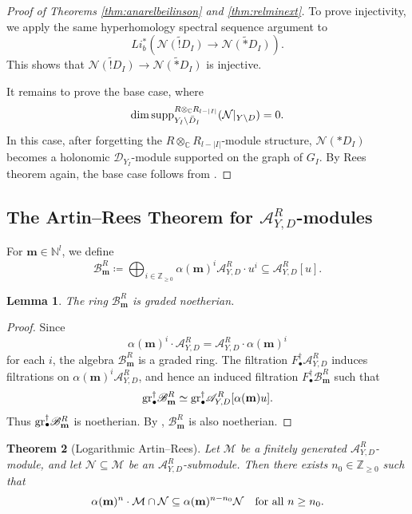 \documentclass{amsart}
\theoremstyle{plain}
\newtheorem{theorem}{Theorem}
\numberwithin{theorem}{section}
\newtheorem{lemma}[theorem]{Lemma}
\theoremstyle{definition}
\theoremstyle{remark}
\theoremstyle{definition}
\newcommand{\wt}{\widetilde}
\newcommand{\C}{\mathbb{C}} %
\newcommand{\N}{\mathbb{N}}
\newcommand{\Z}{\mathbb{Z}}
\newcommand{\cM}{\mathcal{M}}
\newcommand{\cN}{\mathcal{N}}
\newcommand{\bm}{\mathbf{m}}
\newcommand{\gr}{\textup{gr}}
\newcommand{\sB}{\mathscr{B}}
\newcommand{\sA}{\mathscr{A}}
\newcommand{\shD}{\mathscr{D}}
\newcommand{\supp}{\textup{supp}}
\begin{document}
\begin{proof}[Proof of Theorems \ref{thm:anarelbeilinson} and \ref{thm:relminext}]
To prove injectivity, we apply the same hyperhomology spectral sequence
argument to
\[
Li_b^*
\left(
\wt{\cN(!D_I)}
\longrightarrow
\wt{\cN(*D_I)}
\right).
\]
This shows that
$\wt{\cN(!D_I)}
\longrightarrow
\wt{\cN(*D_I)}$
is injective.

It remains to prove the base case, where
\[
\dim
\supp_{Y_I\setminus \bar D_I}^{R\otimes_\C R_{l-|I|}}
(\cN|_{Y\setminus D})
=
0.
\]
In this case, after forgetting the $R\otimes_\C R_{l-|I|}$-module structure,
$\cN(*D_I)$ becomes a holonomic $\shD_{Y_I}$-module supported on the graph of
$G_I$. By Rees theorem again, the base case follows from
\cite[Lem.3.7]{WuRHA}.
\end{proof}

\subsection{The Artin--Rees Theorem for $\sA^R_{Y,D}$-modules}
\label{subsect:logArtinRees}

For $\bm\in \N^l$, we define
\[
\sB^R_\bm
\coloneqq
\bigoplus_{i\in \Z_{\ge 0}}
\alpha(\bm)^i\sA^R_{Y,D}\cdot u^i
\subseteq
\sA^R_{Y,D}[u].
\]

\begin{lemma}
The ring $\sB^R_\bm$ is graded noetherian.
\end{lemma}

\begin{proof}
Since
\[
\alpha(\bm)^i\cdot\sA^R_{Y,D}
=
\sA^R_{Y,D}\cdot\alpha(\bm)^i
\]
for each $i$, the algebra $\sB^R_\bm$ is a graded ring.
The filtration $F^\dagger_\bullet\sA^R_{Y,D}$ induces filtrations on
$\alpha(\bm)^i\sA^R_{Y,D}$, and hence an induced filtration
$F^\dagger_\bullet\sB^R_\bm$ such that
\[
\gr^\dagger_\bullet\sB^R_\bm
\simeq
\gr^\dagger_\bullet\sA^R_{Y,D}[\alpha(\bm)u].
\]
Thus $\gr^\dagger_\bullet\sB^R_\bm$ is noetherian. By
\cite[A.III 1.27]{BJ}, $\sB^R_\bm$ is also noetherian.
\end{proof}

\begin{theorem}[Logarithmic Artin--Rees]\label{thm:artin-reeslog}
Let $\cM$ be a finitely generated $\sA^R_{Y,D}$-module, and let
$\cN\subseteq \cM$ be an $\sA^R_{Y,D}$-submodule. Then there exists
$n_0\in \Z_{\ge 0}$ such that
\[
\alpha(\bm)^n\cdot\cM\cap \cN
\subseteq
\alpha(\bm)^{n-n_0}\cN
\quad
\textup{for all } n\ge n_0.
\]
\end{theorem}
\end{document}
